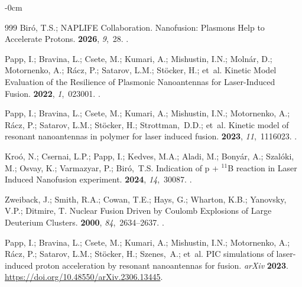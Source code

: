 \documentclass[particles,article,accept,pdftex,moreauthors]{Definitions/mdpi}
\begin{document}
\begin{adjustwidth}{-\extralength}{0cm}
\begin{thebibliography}{999}
Bir{\'o}, T.S.; {NAPLIFE Collaboration}.
\newblock Nanofusion: Plasmons Help to Accelerate Protons.
 {\bf 2026}, {\em 9},~28.
.

Papp, I.;  Bravina, L.; Csete, M.; Kumari, A.; Mishustin, I.N.; Molnár, D.; Motornenko, A.; Rácz, P.; Satarov, L.M.; Stöcker, H.; et~al.
\newblock Kinetic Model Evaluation of the Resilience of Plasmonic Nanoantennas
  for Laser-Induced Fusion.
 {\bf 2022}, {\em 1},~023001.
.

Papp, I.; Bravina, L.;  Csete, M.; Kumari, A.; Mishustin, I.N.; Motornenko, A.; Rácz, P.; Satarov, L.M.; Stöcker, H.; Strottman,~D.D.; et~al.
\newblock Kinetic model of resonant nanoantennas in polymer for laser induced
  fusion.
 {\bf 2023}, {\em 11},~1116023.
.

Kro{\'o}, N.;  Csernai, L.P.; Papp, I.; Kedves, M.A.; Aladi, M.; Bonyár, A.; Szalóki, M.; Osvay, K.; Varmazyar, P.; Biró,~T.S.
\newblock Indication of p + $^{11}$B reaction in Laser Induced Nanofusion
  experiment.
 {\bf 2024}, {\em 14},~30087.
.

Zweiback, J.; Smith, R.A.;  Cowan, T.E.; Hays, G.; Wharton, K.B.; Yanovsky, V.P.; Ditmire, T.
\newblock Nuclear Fusion Driven by Coulomb Explosions of Large Deuterium
  Clusters.
 {\bf 2000}, {\em 84},~2634--2637.
.

Papp, I.;  Bravina, L.; Csete, M.; Kumari, A.; Mishustin, I.N.; Motornenko, A.; Rácz, P.; Satarov, L.M.; Stöcker, H.; Szenes,~A.; et~al.
\newblock PIC simulations of laser-induced proton acceleration by resonant
  nanoantennas for fusion.
\newblock \emph{arXiv}  \textbf{2023}. {\url{https://doi.org/10.48550/arXiv.2306.13445}}.


\end{thebibliography}
\end{adjustwidth}
\end{document}
